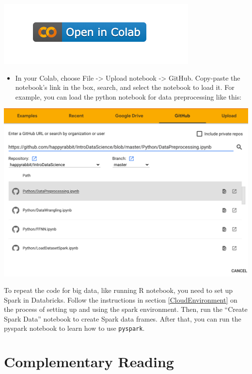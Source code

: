 \documentclass[
  12pt,
]{krantz}
\providecommand{\tightlist}{%
  \setlength{\itemsep}{0pt}\setlength{\parskip}{0pt}}
\begin{document}
\begin{center}\includegraphics[width=0.35\linewidth]{images/colabicon} \end{center}

\begin{itemize}
\tightlist
\item
  In your Colab, choose File -\textgreater{} Upload notebook -\textgreater{} GitHub. Copy-paste the notebook's link in the box, search, and select the notebook to load it. For example, you can load the python notebook for data preprocessing like this:
\end{itemize}

\begin{center}\includegraphics[width=1\linewidth]{images/loadfromgithub} \end{center}

To repeat the code for big data, like running R notebook, you need to set up Spark in Databricks. Follow the instructions in section \ref{CloudEnvironment} on the process of setting up and using the spark environment. Then, run the ``Create Spark Data'' notebook to create Spark data frames. After that, you can run the pyspark notebook to learn how to use \texttt{pyspark}.

\hypertarget{complementary-reading}{%
\section*{Complementary Reading}\label{complementary-reading}}
\end{document}
